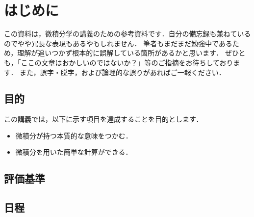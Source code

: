 \chapter{はじめに}
この資料は，微積分学の講義のための参考資料です．自分の備忘録も兼ねているのでやや冗長な表現もあるやもしれません．
筆者もまだまだ勉強中であるため，理解が追いつかず根本的に誤解している箇所があるかと思います．
ぜひとも，「ここの文章はおかしいのではないか？」等のご指摘をお待ちしております．
また，誤字・脱字，および論理的な誤りがあればご一報ください．

\section{目的}
この講義では，以下に示す項目を達成することを目的とします．
\begin{itemize}
	\item 微積分が持つ本質的な意味をつかむ．
	\item 微積分を用いた簡単な計算ができる．
\end{itemize}

\section{評価基準}

\section{日程}